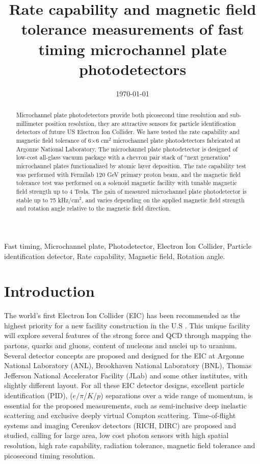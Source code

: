 \documentclass[preprint,5p]{elsarticle}
\title{\vspace{-15mm}\fontsize{24pt}{10pt}\selectfont\textbf{Rate capability 
and magnetic field tolerance measurements of fast timing microchannel plate 
photodetectors}}
\date{\today}
\begin{document}
\begin{abstract}
Microchannel plate photodetectors provide both picosecond time resolution and 
sub-millimeter position resolution, they are attractive sensors for particle 
identification detectors of future US Electron Ion Collider. We have tested the 
rate capability and magnetic field tolerance of 6$\times$6 cm$^{2}$ 
microchannel plate photodetectors fabricated at Argonne National Laboratory.  
The microchannel plate photodetector is designed of low-cost all-glass vacuum 
package with a chevron pair stack of ``next generation" microchannel plates 
functionalized by atomic layer deposition. The rate capability test was 
performed with Fermilab 120 GeV primary proton beam, and the magnetic field 
tolerance test was performed on a solenoid magnetic facility with tunable 
magnetic field strength up to 4 Tesla. The gain of measured microchannel plate 
photodetector is stable up to 75 kHz/cm$^{2}$, and varies depending on the 
applied magnetic field strength and rotation angle relative to the magnetic 
field direction.
\end{abstract}

\maketitle

\begin{keywords}
   Fast timing, Microchannel plate, Photodetector, Electron Ion Collider, 
   Particle identification detector, Rate capability, Magnetic field, Rotation 
   angle.
\end{keywords}


\section{Introduction} \label{sec:level1}
The world's first Electron Ion Collider (EIC) \cite{EIC} has been recommended 
as the highest priority for a new facility construction in the U.S \cite{LRP}.  
This unique facility will explore several features of the strong force and QCD 
through mapping the partons, quarks and gluons, content of nucleons and nuclei 
up to uranium. Several detector concepts are proposed and designed for the EIC 
at Argonne National Laboratory (ANL), Brookhaven National Laboratory (BNL), 
Thomas Jefferson National Accelerator Facility (JLab) and some other 
institutes, with slightly different layout. For all these EIC detector designs, 
excellent particle identification (PID), ($e$/$\pi$/$K$/$p$) separations over a 
wide range of momentum, is essential for the proposed measurements, such as 
semi-inclusive deep inelastic scattering and exclusive deeply virtual Compton 
scattering. Time-of-flight systems and imaging \u Cerenkov detectors (RICH, 
DIRC) \cite{RICH,RICH2,DRIC} are proposed and studied, calling for large area, 
low cost photon sensors with high spatial resolution, high rate capability, 
radiation tolerance, magnetic field tolerance and picosecond timing resolution. 
\end{document}
